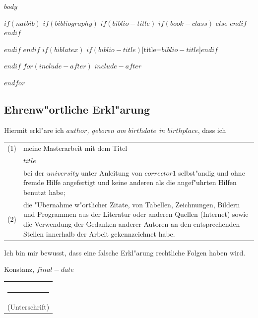 \documentclass[$if(fontsize)$$fontsize$,$endif$$if(lang)$$babel-lang$,$endif$$if(papersize)$$papersize$paper,$endif$$for(classoption)$$classoption$$sep$,$endfor$]{$documentclass$}
\begin{document}
\begin{acronym}[LAENGE]


\end{acronym}


\cleardoublepage



$body$

$if(natbib)$
$if(bibliography)$
$if(biblio-title)$
$if(book-class)$
\renewcommand\bibname{$biblio-title$}
$else$
\renewcommand\refname{$biblio-title$}
$endif$
$endif$


$endif$
$endif$
$if(biblatex)$
\printbibliography$if(biblio-title)$[title=$biblio-title$]$endif$

$endif$
$for(include-after)$
$include-after$

$endfor$

\begin{singlespace}

\chapter*{Ehrenw"ortliche Erkl"arung}

Hiermit erkl"are ich 
\textit{$author$, geboren am $birthdate$ in $birthplace$}, dass ich\\

\begin{tabular}{lp{12cm}}
(1) & meine Masterarbeit mit dem Titel \\[1em]
& \textbf{$title$} \\[1em]
& bei der $university$ unter Anleitung von $corrector1$ selbst"andig und ohne fremde Hilfe angefertigt und keine anderen als die angef"uhrten Hilfen benutzt habe;\\[1em]
(2) & die "Ubernahme w"ortlicher Zitate, von Tabellen, Zeichnungen, Bildern und
Programmen aus der Literatur oder anderen Quellen (Internet) sowie die Verwendung
der Gedanken anderer Autoren an den entsprechenden Stellen innerhalb der Arbeit
gekennzeichnet habe.\\
\end{tabular}

\vspace*{1cm}

\noindent
Ich bin mir bewusst, dass eine falsche Erkl"arung rechtliche Folgen haben wird.\\

\vspace*{3cm}

\noindent
Konstanz, $final-date$ \hfill \begin{tabular}{c} \\ \\ \rule{5cm}{1pt} \\ (Unterschrift)\end{tabular}

\end{singlespace}
\end{document}
